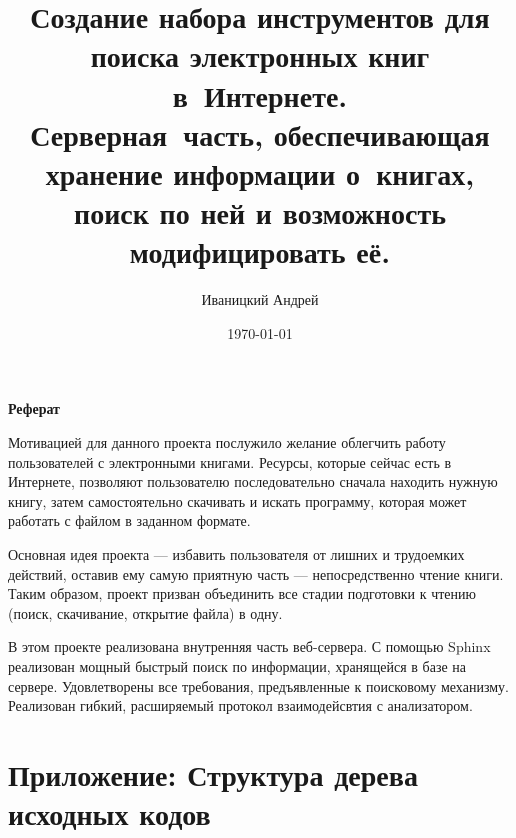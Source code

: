 \documentclass[a4paper,12pt]{article}
\begin{document}
\title{Создание набора инструментов для поиска электронных книг в~Интернете.\\
Серверная~часть, 
обеспечивающая хранение информации о~книгах, поиск по ней и возможность модифицировать её.}
\author{Иваницкий Андрей}
\date{\today}
\maketitle

\newpage


\begin{center}
\textbf{Реферат}
\end{center}

Мотивацией для данного проекта послужило желание облегчить работу пользователей с электронными книгами. Ресурсы, которые сейчас есть в Интернете, позволяют пользователю последовательно сначала находить нужную книгу, затем самостоятельно скачивать и искать программу, которая может работать с файлом в заданном формате.

Основная идея проекта --- избавить пользователя от лишних и трудоемких действий, оставив ему самую приятную часть --- непосредственно чтение книги. Таким образом, проект призван объединить все стадии подготовки к чтению (поиск, скачивание, открытие файла) в одну.

В этом проекте реализована внутренняя часть веб-сервера.
С помощью Sphinx реализован мощный быстрый поиск по информации, хранящейся в базе на сервере.
Удовлетворены все требования, предъявленные к поисковому механизму.
Реализован гибкий, расширяемый протокол взаимодейсвтия с анализатором.


\newpage
\tableofcontents
\newpage


%

%

%

%

%






\section{Приложение: Структура дерева исходных кодов}
\end{document}
